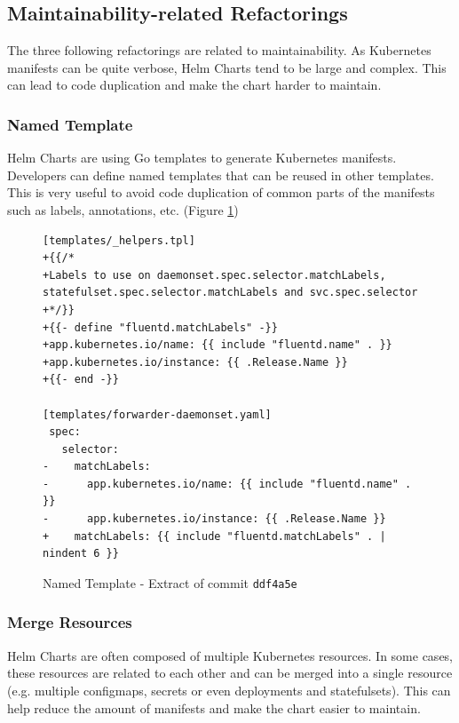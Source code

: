 \documentclass[conference]{IEEEtran}
\begin{document}
\subsection{Maintainability-related Refactorings}

The three following refactorings are related to maintainability. As Kubernetes manifests can be quite verbose, Helm Charts tend to be large and complex. This can lead to code duplication and make the chart harder to maintain.

\subsubsection{Named Template}
Helm Charts are using Go templates \cite{gotpl} to generate Kubernetes manifests. Developers can define named templates that can be reused in other templates. This is very useful to avoid code duplication of common parts of the manifests such as labels, annotations, etc. (Figure \ref{fig:namedtpl})

\begin{figure}
    \begin{verbatim}
[templates/_helpers.tpl]
+{{/*
+Labels to use on daemonset.spec.selector.matchLabels, statefulset.spec.selector.matchLabels and svc.spec.selector
+*/}}
+{{- define "fluentd.matchLabels" -}}
+app.kubernetes.io/name: {{ include "fluentd.name" . }}
+app.kubernetes.io/instance: {{ .Release.Name }}
+{{- end -}}

[templates/forwarder-daemonset.yaml]
 spec:
   selector:
-    matchLabels:
-      app.kubernetes.io/name: {{ include "fluentd.name" . }}
-      app.kubernetes.io/instance: {{ .Release.Name }}
+    matchLabels: {{ include "fluentd.matchLabels" . | nindent 6 }}
    \end{verbatim}
    \caption{Named Template - Extract of commit \texttt{ddf4a5e}}
    \label{fig:namedtpl}
\end{figure}

\subsubsection{Merge Resources}
Helm Charts are often composed of multiple Kubernetes resources. In some cases, these resources are related to each other and can be merged into a single resource (e.g. multiple configmaps, secrets or even deployments and statefulsets). This can help reduce the amount of manifests and make the chart easier to maintain.
\end{document}

